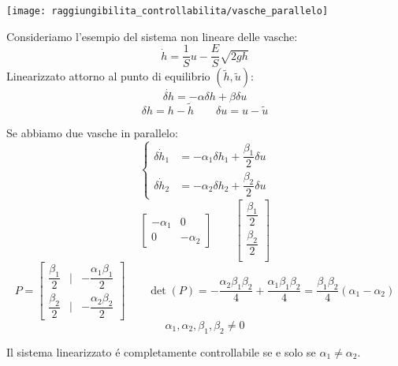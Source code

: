 \documentclass[../main.tex]{subfiles}
\begin{document}
		\begin{Exercise}[title={Studiare la controllabilit\'a di due vasche in parallelo}, difficulty=2]
			\begin{center}
				\texttt{[image: raggiungibilita\_controllabilita/vasche\_parallelo]}
			\end{center}
			Consideriamo l'esempio del sistema non lineare delle vasche:
			\[ \dot h = \dfrac{1}{S}u - \dfrac{E}{S}\sqrt{2gh} \]
			Linearizzato attorno al punto di equilibrio $ (\tilde h, \tilde u) $:
			\[ \dot{\delta h} = -\alpha \delta h + \beta \delta u \]
			\[ \delta h = h - \tilde h \qquad \delta u = u - \tilde u \]
			
			Se abbiamo due vasche in parallelo:
			\[
				\begin{cases}
					\dot{\delta h_1} &= -\alpha_1 \delta h_1 + \dfrac{\beta_1}{2} \delta u\\
					\dot{\delta h_2} &= -\alpha_2 \delta h_2 + \dfrac{\beta_2}{2} \delta u
				\end{cases}
			\]
			\[
				\begin{bmatrix}
					-\alpha_1 & 0\\
					0 & -\alpha_2
				\end{bmatrix} \qquad
				\begin{bmatrix}
					\dfrac{\beta_1}{2}\\
					\dfrac{\beta_2}{2}\\
				\end{bmatrix}
			\]
			\[
				P=
				\begin{bmatrix}
					\dfrac{\beta_1}{2} & | & -\dfrac{\alpha_1 \beta_1}{2}\\
					\dfrac{\beta_2}{2} & | & -\dfrac{\alpha_2 \beta_2}{2}
				\end{bmatrix}\qquad
				\det(P) = -\dfrac{\alpha_2 \beta_1 \beta_2}{4} + \dfrac{\alpha_1 \beta_1 \beta_2}{4} = \dfrac{\beta_1 \beta_2}{4} \left( \alpha_1 - \alpha_2 \right)
			\]
			\[ \alpha_1, \alpha_2, \beta_1, \beta_2 \neq 0 \]
			
			Il sistema linearizzato \'e completamente controllabile se e solo se $ \alpha_1 \neq \alpha_2 $.
		\end{Exercise}
	
\end{document}
